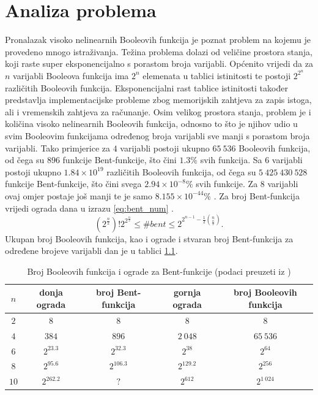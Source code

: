 \chapter{Analiza problema}
Pronalazak visoko nelinearnih Booleovih funkcija je poznat problem na kojemu je provedeno mnogo istraživanja.
Težina problema dolazi od veličine prostora stanja, koji raste super eksponencijalno s porastom broja varijabli.
Općenito vrijedi da za $n$ varijabli Booleova funkcija ima $2^n$ elemenata u tablici istinitosti te postoji $2^{2^n}$ različitih Booleovih funkcija.
Eksponencijalni rast tablice istinitosti također predstavlja implementacijske probleme zbog memorijskih zahtjeva za zapis istoga, ali i vremenskih zahtjeva za računanje.
Osim velikog prostora stanja, problem je i količina visoko nelinearnih Booleovih funkcija, odnosno to što je njihov udio u svim Booleovim funkcijama određenog broja varijabli sve manji s porastom broja varijabli.
Tako primjerice za $4$ varijabli postoji ukupno $65\:536$ Booleovih funkcija, od čega su $896$ funkcije Bent-funkcije, što čini $1.3\%$ svih funkcija.
Sa $6$ varijabli postoji ukupno $1.84 \times 10^{19}$ različitih Booleovih funkcija, od čega su $5\:425\:430\:528$ funkcije Bent-funkcije, što čini svega $2.94 \times 10^{-8}\%$ svih funkcije.
Za $8$ varijabli ovaj omjer postaje još manji te je samo $8.155 \times 10^{-44}\%$ \cite{DiscoveryOfBent}.
Za broj Bent-funkcija vrijedi ograda dana u izrazu \eqref{eq:bent_num} \cite{CryptographicBooleanFunctions}.
\begin{equation}\label{eq:bent_num}
    \left(2^{\frac{n}{2}}\right)! 2^{2^{\frac{n}{2}}} \leq
    \#bent \leq
    2^{2^{n-1}-\frac{1}{2}\binom{n}{\frac{n}{2}}}.
\end{equation}
Ukupan broj Booleovih funkcija, kao i ograde i stvaran broj Bent-funkcija za određene brojeve varijabli dan je u tablici \ref{tbl:boolean_count}.
\begin{table}[]
\caption{Broj Booleovih funkcija i ograde za Bent-funkcije (podaci preuzeti iz \cite{CryptographicBooleanFunctions})}
\begin{tabular}{c|cccc}
$n$ & donja ograda & broj Bent-funkcija & gornja ograda & broj Booleovih funkcija \\ \hline
$2$ & $8$ & $8$ & $8$ & $8$ \\
$4$ & $384$ & $896$ & $2\:048$ & $65\:536$ \\
$6$ & $2^{23.3}$ & $2^{32.3}$ & $2^{38}$ & $2^{64}$ \\
$8$ & $2^{95.6}$ & $2^{106.3}$ & $2^{129.2}$ & $2^{256}$ \\
$10$ & $2^{262.2}$ & $?$ & $2^{612}$ & $2^{1\:024}$
\end{tabular}
\label{tbl:boolean_count}
\end{table}

